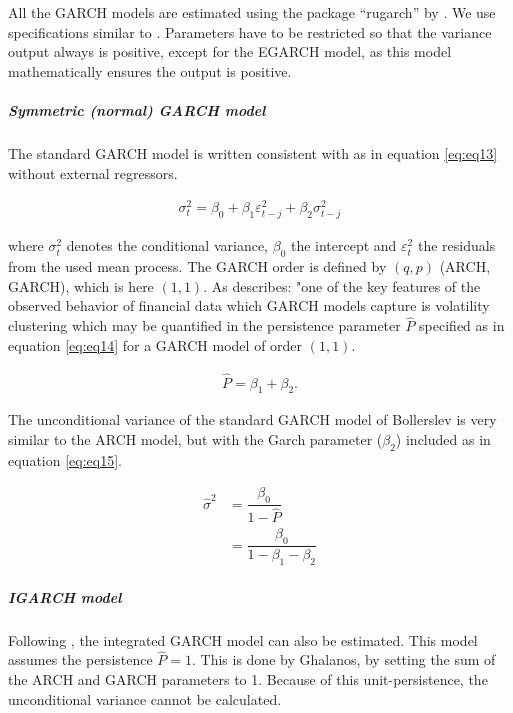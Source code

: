 \documentclass[a4paper, twoside]{templates/ociamthesis}
\begin{document}
All the GARCH models are estimated using the package ``rugarch'' by \textcite{alexios2020}. We use specifications similar to \textcite{ghalanos2020}. Parameters have to be restricted so that the variance output always is positive, except for the EGARCH model, as this model mathematically ensures the output is positive.

\hypertarget{symmetric-normal-garch-model}{%
\subparagraph{Symmetric (normal) GARCH model}\label{symmetric-normal-garch-model}}

\noindent The standard GARCH model \autocite{bollerslev1986} is written consistent with \textcite{ghalanos2020} as in equation \eqref{eq:eq13} without external regressors.

\begin{align}
\sigma_t^2 = \beta_0  +  {\beta_1}\varepsilon _{t-j}^2 + {\beta_2}\sigma_{t-j}^2
 \label{eq:eq13}
\end{align}

\noindent where \(\sigma_t^2\) denotes the conditional variance, \(\beta_0\) the intercept and \(\varepsilon_t^2\) the residuals from the used mean process. The GARCH order is defined by \((q, p)\) (ARCH, GARCH), which is here \((1, 1)\). As \textcite{ghalanos2020} describes: "one of the key features of the observed behavior of financial data which GARCH models capture is volatility clustering which may be quantified in the persistence parameter \(\hat{P}\) specified as in equation \eqref{eq:eq14} for a GARCH model of order \((1,1)\).

\begin{align}
\hat{P} =  \beta_1  + \beta_2.
 \label{eq:eq14}
\end{align}

\noindent The unconditional variance of the standard GARCH model of Bollerslev is very similar to the ARCH model, but with the Garch parameter (\(\beta_2\)) included as in equation \eqref{eq:eq15}.

\begin{equation}
\begin{split}
\hat{\sigma}^2 
&= \dfrac{\beta_0}{1 - \hat{P}} \\
&= \dfrac{\beta_0}{1 - \beta_1 - \beta_2}
\end{split}
 \label{eq:eq15}
\end{equation}

\hypertarget{igarch-model}{%
\subparagraph{IGARCH model}\label{igarch-model}}

\noindent Following \textcite{ghalanos2020}, the integrated GARCH model \autocite{bollerslev1986} can also be estimated. This model assumes the persistence \(\hat{P} = 1\). This is done by Ghalanos, by setting the sum of the ARCH and GARCH parameters to 1. Because of this unit-persistence, the unconditional variance cannot be calculated.
\end{document}
